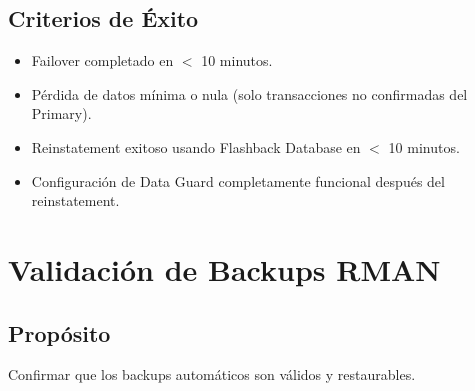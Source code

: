 \documentclass[11pt, a4paper]{report}
\begin{document}
\subsection{Criterios de Éxito}
\begin{itemize}
    \item Failover completado en $<$ 10 minutos.
    \item Pérdida de datos mínima o nula (solo transacciones no confirmadas del Primary).
    \item Reinstatement exitoso usando Flashback Database en $<$ 10 minutos.
    \item Configuración de Data Guard completamente funcional después del reinstatement.
\end{itemize}

\section{Validación de Backups RMAN}

\subsection{Propósito}
Confirmar que los backups automáticos son válidos y restaurables.
\end{document}
